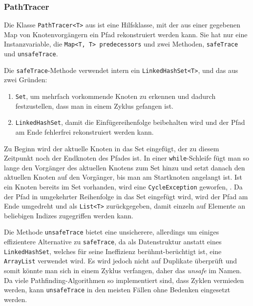             \subsubsection{PathTracer}
        
                Die Klasse \lstinline{PathTracer<T>} aus  ist eine Hilfsklasse, mit der aus einer gegebenen Map von Knotenvorgängern ein Pfad rekonstruiert werden kann. Sie hat nur eine Instanzvariable, die \lstinline{Map<T, T> predecessors} und zwei Methoden, \lstinline{safeTrace} und \lstinline{unsafeTrace}.
            
                Die \lstinline{safeTrace}-Methode verwendet intern ein \lstinline{LinkedHashSet<T>}, und das aus zwei Gründen:
        
                \begin{enumerate}
                    \item \lstinline{Set}, um mehrfach vorkommende Knoten zu erkennen und dadurch festzustellen, dass man in einem Zyklus gefangen ist.
        
                    \item \lstinline{LinkedHashSet}, damit die Einfügereihenfolge beibehalten wird und der Pfad am Ende fehlerfrei rekonstruiert werden kann.
                \end{enumerate}
        
                Zu Beginn wird der aktuelle Knoten in das Set eingefügt, der zu diesem Zeitpunkt noch der Endknoten des Pfades ist. In einer \lstinline{while}-Schleife fügt man so lange den Vorgänger des aktuellen Knotens zum Set hinzu und setzt danach den aktuellen Knoten auf den Vorgänger, bis man am Startknoten angelangt ist. Ist ein Knoten bereits im Set vorhanden, wird eine \lstinline{CycleException} geworfen, . Da der Pfad in umgekehrter Reihenfolge in das Set eingefügt wird, wird der Pfad am Ende umgedreht und als \lstinline{List<T>} zurückgegeben, damit einzeln auf Elemente an beliebigen Indizes zugegriffen werden kann.

                Die Methode \lstinline{unsafeTrace} bietet eine unsicherere, allerdings um einiges effizientere Alternative zu \lstinline{safeTrace}, da als Datenstruktur anstatt eines \lstinline{LinkedHashSet}, welches für seine Ineffizienz berühmt-berüchtigt ist, eine \lstinline{ArrayList} verwendet wird. Es wird jedoch nicht auf Duplikate überprüft und somit könnte man sich in einem Zyklus verfangen, daher das \emph{unsafe} im Namen. Da viele Pathfinding-Algorithmen so implementiert sind, dass Zyklen vermieden werden, kann \lstinline{unsafeTrace} in den meisten Fällen ohne Bedenken eingesetzt werden.
        
